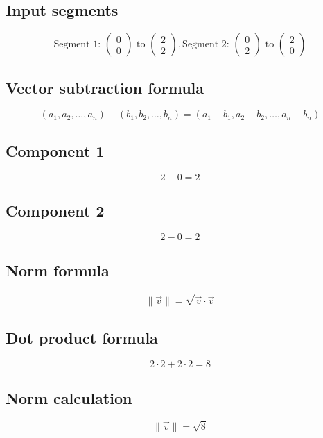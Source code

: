 \documentclass{article}
\begin{document}
\subsection*{ \vspace{1em} Input segments}
\[
\text{Segment 1: } \begin{pmatrix}0 \\ 0 \end{pmatrix} \text{ to } \begin{pmatrix}2 \\ 2\end{pmatrix},
        \text{Segment 2: } \begin{pmatrix}0 \\ 2\end{pmatrix} \text{ to } \begin{pmatrix}2 \\ 0\end{pmatrix}
\]
\subsection*{ \vspace{1em} Vector subtraction formula}
\[
(a_1, a_2, \dots, a_n) - (b_1, b_2, \dots, b_n) = (a_1 - b_1, a_2 - b_2, \dots, a_n - b_n)
\]
\subsection*{ \vspace{1em} Component 1}
\[
2 - 0 = 2
\]
\subsection*{ \vspace{1em} Component 2}
\[
2 - 0 = 2
\]
\subsection*{ \vspace{1em} Norm formula}
\[
\|\vec{v}\| = \sqrt{\vec{v} \cdot \vec{v}}
\]
\subsection*{ \vspace{1em} Dot product formula}
\[
2 \cdot 2 + 2 \cdot 2 = 8
\]
\subsection*{ \vspace{1em} Norm calculation}
\[
\|\vec{v}\| = \sqrt{8}
\]
\end{document}
